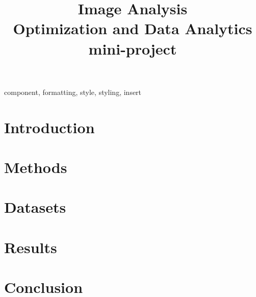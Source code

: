 \documentclass[conference]{IEEEtran}
\begin{document}
\title{Image Analysis\\
{\footnotesize Optimization and Data Analytics mini-project}}

\author{
}

\maketitle

\begin{abstract}
\end{abstract}

\begin{IEEEkeywords}
component, formatting, style, styling, insert
\end{IEEEkeywords}

\section{Introduction}


\section{Methods}


\section{Datasets}


\section{Results}



\section{Conclusion}


\onecolumn
\newpage
\listoftodos[Notes]
\end{document}
